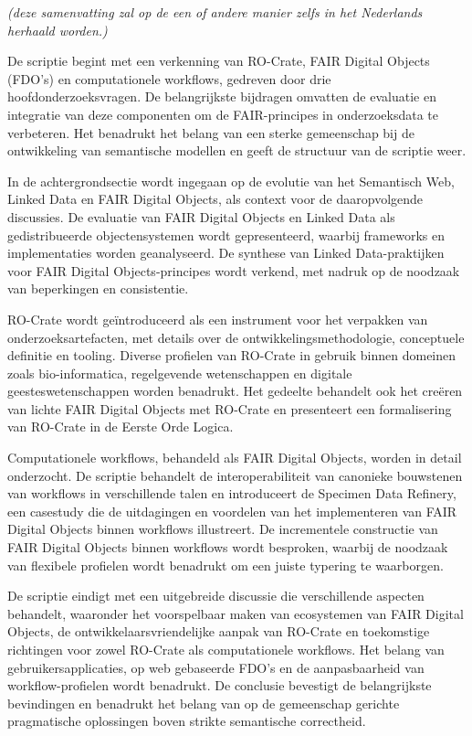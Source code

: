 \emph{(deze samenvatting zal op de een of andere manier zelfs in
het Nederlands herhaald
worden.)}

De scriptie begint met een verkenning van RO-Crate, FAIR Digital Objects (FDO's) en 
computationele workflows, gedreven door drie hoofdonderzoeksvragen. De belangrijkste bijdragen omvatten de evaluatie en integratie van deze componenten om de FAIR-principes in onderzoeksdata te verbeteren. Het benadrukt het belang van een sterke gemeenschap bij de ontwikkeling van semantische modellen en geeft de structuur van de scriptie weer.

In de achtergrondsectie wordt ingegaan op de evolutie van het Semantisch Web, Linked Data en FAIR Digital Objects, als context voor de daaropvolgende discussies. De evaluatie van FAIR Digital Objects en Linked Data als gedistribueerde objectensystemen wordt gepresenteerd, waarbij frameworks en implementaties worden geanalyseerd. De synthese van Linked Data-praktijken voor FAIR Digital Objects-principes wordt verkend, met nadruk op de noodzaak van beperkingen en consistentie.

RO-Crate wordt geïntroduceerd als een instrument voor het verpakken van onderzoeksartefacten, met details over de ontwikkelingsmethodologie, conceptuele definitie en tooling. Diverse profielen van RO-Crate in gebruik binnen domeinen zoals bio-informatica, regelgevende wetenschappen en digitale geesteswetenschappen worden benadrukt. Het gedeelte behandelt ook het creëren van lichte FAIR Digital Objects met RO-Crate en presenteert een formalisering van RO-Crate in de Eerste Orde Logica.

Computationele workflows, behandeld als FAIR Digital Objects, worden in detail onderzocht. De scriptie behandelt de interoperabiliteit van canonieke bouwstenen van workflows in verschillende talen en introduceert de Specimen Data Refinery, een casestudy die de uitdagingen en voordelen van het implementeren van FAIR Digital Objects binnen workflows illustreert. De incrementele constructie van FAIR Digital Objects binnen workflows wordt besproken, waarbij de noodzaak van flexibele profielen wordt benadrukt om een juiste typering te waarborgen.

De scriptie eindigt met een uitgebreide discussie die verschillende aspecten behandelt, waaronder het voorspelbaar maken van ecosystemen van FAIR Digital Objects, de ontwikkelaarsvriendelijke aanpak van RO-Crate en toekomstige richtingen voor zowel RO-Crate als computationele workflows. Het belang van gebruikersapplicaties, op web gebaseerde FDO's en de aanpasbaarheid van workflow-profielen wordt benadrukt. De conclusie bevestigt de belangrijkste bevindingen en benadrukt het belang van op de gemeenschap gerichte pragmatische oplossingen boven strikte semantische correctheid.